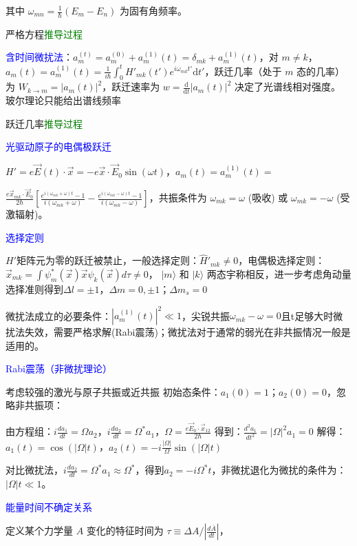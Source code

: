 \documentclass[a4paper,8pt]{extarticle} %
\newcommand{\bluetext}[1]{\textcolor{blue}{#1}}
\newcommand{\greentext}[1]{\textcolor{green}{#1}}
\begin{document}
\begin{multicols}{3}
其中 $\omega_{mn} = \frac{1}{\hbar}(E_m - E_n)$ 为固有角频率。

严格方程\greentext{推导过程}

\bluetext{含时间微扰法}：$a_m^{(t)} = a_m^{(0)} + a_m^{(1)}(t) = \delta_{mk} + a_m^{(1)}(t)$，对 $m \neq k$，$a_m(t) = a_m^{(1)}(t) = \frac{1}{i\hbar}\int_0^t H'_{mk}(t')e^{i\omega_{mk}t'} \mathrm{d}t'$，跃迁几率（处于 $m$ 态的几率）为 $W_{k\to m} = |a_m(t)|^2$，跃迁速率为 $w = \frac{\mathrm{d}}{{\mathrm{d}t}}|a_m(t)|^2$ 决定了光谱线相对强度。
玻尔理论只能给出谱线频率

跃迁几率\greentext{推导过程}

\bluetext{光驱动原子的电偶极跃迁}

$H' = e\vec{E}(t)\cdot\vec{x} = -e\vec{x}\cdot\vec{E}_0\sin(\omega t)$，$a_m(t) = a_m^{(1)}(t) =$ 

$ \frac{e\vec{x}_{mk}\cdot\vec{E}_0}{2\hbar}\left[\frac{e^{i(\omega_{mk}+\omega)t}-1}{i(\omega_{mk}+\omega)} - \frac{e^{i(\omega_{mk}-\omega)t}-1}{i(\omega_{mk}-\omega)}\right]$，共振条件为 $\omega_{mk} = \omega$ (吸收) 或 $\omega_{mk} = -\omega$ (受激辐射)。

\bluetext{选择定则}

$H'$矩阵元为零的跃迁被禁止，一般选择定则：$\hat{H}'_{mk}\neq 0$，电偶极选择定则：$\vec{x}_{mk}=\int{\psi_m^*(\vec{x})\vec{x}\psi_k(\vec{x}) d\tau} \neq 0$，
$|m\rangle$ 和 $|k\rangle$ 两态宇称相反，进一步考虑角动量选择准则得到$\Delta l = \pm1$，$\Delta m = 0, \pm1$；$\Delta m_s = 0$

微扰法成立的必要条件：$|a_m^{(1)}(t)|^2\ll 1$，尖锐共振$\omega_{mk}-\omega=0$且t足够大时微扰法失效，需要严格求解(Rabi震荡)；微扰法对于通常的弱光在非共振情况一般是适用的。

\bluetext{Rabi震荡（非微扰理论）}

考虑较强的激光与原子共振或近共振
初始态条件：$a_1(0) = 1$；$a_2(0) = 0$，忽略非共振项：

由方程组：$i\frac{da_1}{dt} = \Omega a_2$，$i\frac{da_2}{dt} = \Omega^* a_1$，$\Omega = \frac{e\vec{E}_0\cdot\vec{x}_{12}}{2\hbar}$ 得到：$\frac{d^2a_1}{dt^2} = |\Omega|^2 a_1 = 0$ 解得：$a_1(t) = \cos(|\Omega|t)$，$a_2(t) = -i\frac{|\Omega|}{\Omega}\sin(|\Omega|t)$

对比微扰法，$i\frac{da_2}{dt} = \Omega^* a_1 \approx \Omega^* $，得到$a_2 = -i\Omega^* t$，非微扰退化为微扰的条件为：$|\Omega|t \ll 1$。

\bluetext{能量时间不确定关系}

定义某个力学量 $A$ 变化的特征时间为 $\tau \equiv \Delta A/|\frac{d\overline{A}}{dt}|$，


\end{multicols}
\end{document}
